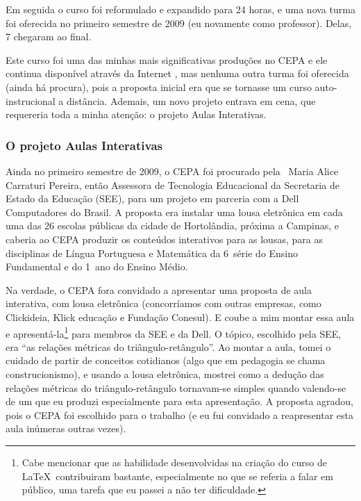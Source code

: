 Em seguida o curso foi reformulado e expandido para 24 horas, e uma nova turma foi oferecida no primeiro semestre de 2009 (eu novamente como professor). Delas, 7 chegaram ao final.

Este curso foi uma das minhas mais significativas produções no CEPA e ele continua disponível através da Internet \cite{curso-LaTeX}, mas nenhuma outra turma foi oferecida (ainda há procura), pois a proposta inicial era que se tornasse um curso auto-instrucional a distância. Ademais, um novo projeto entrava em cena, que requereria toda a minha atenção: o projeto Aulas Interativas.

\subsubsection{O projeto Aulas Interativas}
\label{sec:aulas-interativas}

Ainda no primeiro semestre de 2009, o CEPA foi procurado pela \profa\ Maria Alice Carraturi Pereira, então Assessora de Tecnologia Educacional da Secretaria de Estado da Educação (SEE), para um projeto em parceria com a Dell Computadores do Brasil. A proposta era instalar uma lousa eletrônica em cada uma das 26 escolas públicas da cidade de Hortolândia, próxima a Campinas, e caberia ao CEPA produzir os conteúdos interativos para as lousas, para as disciplinas de Língua Portuguesa e Matemática da 6\textordfeminine\ série do Ensino Fundamental e do 1\textordmasculine\ ano do Ensino Médio.

Na verdade, o CEPA fora convidado a apresentar uma proposta de aula interativa, com lousa eletrônica (concorríamos com outras empresas, como Clickideia, Klick educação e Fundação Conesul). E coube a mim montar essa aula e apresentá-la\footnote{Cabe mencionar que as habilidade desenvolvidas na criação do curso de \LaTeX\ contribuiram bastante, especialmente no que se referia a falar em público, uma tarefa que eu passei a não ter dificuldade.} para membros da SEE e da Dell. O tópico, escolhido pela SEE, era ``as relações métricas do triângulo-retângulo''. Ao montar a aula, tomei o cuidado de partir de conceitos cotidianos (algo que em pedagogia se chama construcionismo), e usando a lousa eletrônica, mostrei como a dedução das relações métricas do triângulo-retângulo tornavam-se simples quando valendo-se de um  que eu produzi especialmente para esta apresentação. A proposta agradou, pois o CEPA foi escolhido para o trabalho (e eu fui convidado a reapresentar esta aula inúmeras outras vezes).

